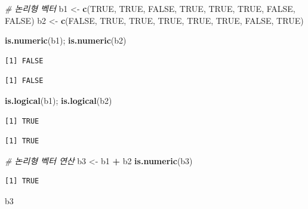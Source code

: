 \documentclass[
  11pt,
]{krantz}
\newenvironment{Shaded}{\begin{snugshade}}{\end{snugshade}}
\newcommand{\CommentTok}[1]{\textcolor[rgb]{0.37,0.37,0.37}{\textit{#1}}}
\newcommand{\KeywordTok}[1]{\textcolor[rgb]{0.27,0.27,0.27}{\textbf{#1}}}
\newcommand{\NormalTok}[1]{#1}
\newcommand{\OperatorTok}[1]{\textcolor[rgb]{0.43,0.43,0.43}{\textbf{#1}}}
\newcommand{\OtherTok}[1]{\textcolor[rgb]{0.37,0.37,0.37}{#1}}
\newcommand{\StringTok}[1]{\textcolor[rgb]{0.5,0.5,0.5}{#1}}
\begin{document}
\begin{Shaded}
\begin{Highlighting}[]
\CommentTok{# 논리형 벡터}
\NormalTok{b1 <-}\StringTok{ }\KeywordTok{c}\NormalTok{(}\OtherTok{TRUE}\NormalTok{, }\OtherTok{TRUE}\NormalTok{, }\OtherTok{FALSE}\NormalTok{, }\OtherTok{TRUE}\NormalTok{, }\OtherTok{TRUE}\NormalTok{, }\OtherTok{TRUE}\NormalTok{, }\OtherTok{FALSE}\NormalTok{, }\OtherTok{FALSE}\NormalTok{)}
\NormalTok{b2 <-}\StringTok{ }\KeywordTok{c}\NormalTok{(}\OtherTok{FALSE}\NormalTok{, }\OtherTok{TRUE}\NormalTok{, }\OtherTok{TRUE}\NormalTok{, }\OtherTok{TRUE}\NormalTok{, }\OtherTok{TRUE}\NormalTok{, }\OtherTok{TRUE}\NormalTok{, }\OtherTok{FALSE}\NormalTok{, }\OtherTok{TRUE}\NormalTok{)}

\KeywordTok{is.numeric}\NormalTok{(b1); }\KeywordTok{is.numeric}\NormalTok{(b2)}
\end{Highlighting}
\end{Shaded}

\begin{verbatim}
[1] FALSE
\end{verbatim}

\begin{verbatim}
[1] FALSE
\end{verbatim}

\begin{Shaded}
\begin{Highlighting}[]
\KeywordTok{is.logical}\NormalTok{(b1); }\KeywordTok{is.logical}\NormalTok{(b2)}
\end{Highlighting}
\end{Shaded}

\begin{verbatim}
[1] TRUE
\end{verbatim}

\begin{verbatim}
[1] TRUE
\end{verbatim}

\begin{Shaded}
\begin{Highlighting}[]
\CommentTok{# 논리형 벡터 연산}
\NormalTok{b3 <-}\StringTok{ }\NormalTok{b1 }\OperatorTok{+}\StringTok{ }\NormalTok{b2}
\KeywordTok{is.numeric}\NormalTok{(b3)}
\end{Highlighting}
\end{Shaded}

\begin{verbatim}
[1] TRUE
\end{verbatim}

\begin{Shaded}
\begin{Highlighting}[]
\NormalTok{b3}
\end{Highlighting}
\end{Shaded}
\end{document}
